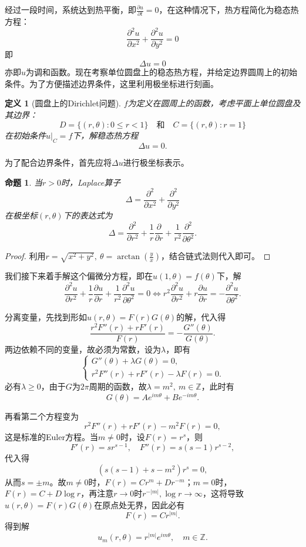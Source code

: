 \documentclass[UTF8,zihao=5,linespread=1.34]{ctexart}
\theoremstyle{cnplain}
\newtheorem{proposition}[theorem]{命题}
\newtheorem{definition}[theorem]{定义}
\theoremstyle{cnremark}
\begin{document}
经过一段时间，系统达到热平衡，即$\frac{\partial u}{\partial t} = 0$，在这种情况下，热方程简化为稳态热方程：
\[
\frac{\partial^{2}u}{\partial x^{2}} + \frac{\partial^{2}u}{\partial y^{2}} = 0
\]
即
\[
\Delta u = 0
\]
亦即$u$为调和函数。现在考察单位圆盘上的稳态热方程，并给定边界圆周上的初始条件。为了方便描述边界条件，这里利用极坐标进行刻画。

\begin{definition}[圆盘上的Dirichlet问题]
$f$为定义在圆周上的函数，考虑平面上单位圆盘及其边界：
\[
D = \{(r,\theta): 0 \leq r < 1\}\quad\text{和}\quad C = \{(r,\theta): r = 1\}
\]
在初始条件$u|_{C} = f$下，解稳态热方程
\[
\Delta u = 0.
\]
\end{definition}

为了配合边界条件，首先应将$\Delta u$进行极坐标表示。

\begin{proposition}\label{prop:polar-laplacian}
当$r>0$时，Laplace算子
\[
\Delta = \frac{\partial^{2}}{\partial x^{2}} + \frac{\partial^{2}}{\partial y^{2}}
\]
在极坐标$(r,\theta)$下的表达式为
\[
\Delta = \frac{\partial^{2}}{\partial r^{2}} + \frac{1}{r}\frac{\partial}{\partial r} + \frac{1}{r^{2}}\frac{\partial^{2}}{\partial\theta^{2}}.
\]
\end{proposition}

\begin{proof}
利用$r = \sqrt{x^{2} + y^{2}},\ \theta = \arctan(\frac{y}{x})$，结合链式法则代入即可。
\end{proof}

我们接下来着手解这个偏微分方程，即在$u(1,\theta) = f(\theta)$下，解
\[
\frac{\partial^{2}u}{\partial r^{2}} + \frac{1}{r}\frac{\partial u}{\partial r} + \frac{1}{r^{2}}\frac{\partial^{2}u}{\partial\theta^{2}} = 0
\Longleftrightarrow r^{2}\frac{\partial^{2}u}{\partial r^{2}} + r\frac{\partial u}{\partial r} = -\frac{\partial^{2}u}{\partial\theta^{2}}.
\]

分离变量，先找到形如$u(r,\theta) = F(r)G(\theta)$的解，代入得
\[
\frac{r^{2}F''(r) + rF'(r)}{F(r)} = -\frac{G''(\theta)}{G(\theta)}.
\]
两边依赖不同的变量，故必须为常数，设为$\lambda$，即有
\[
\begin{cases}
G''(\theta) + \lambda G(\theta) = 0, \\
r^{2}F''(r) + rF'(r) - \lambda F(r) = 0.
\end{cases}
\]
必有$\lambda \geq 0$，由于$G$为$2\pi$周期的函数，故$\lambda = m^{2},\ m \in \mathbb{Z}$，此时有
\[
G(\theta) = Ae^{im\theta} + Be^{-im\theta}.
\]

再看第二个方程变为
\[
r^{2}F''(r) + rF'(r) - m^{2}F(r) = 0,
\]
这是标准的Euler方程。当$m \neq 0$时，设$F(r) = r^{s}$，则
\[
F'(r) = sr^{s-1},\quad F''(r) = s(s-1)r^{s-2},
\]
代入得
\[
(s(s-1) + s - m^{2})r^{s} = 0,
\]
从而$s = \pm m$。故$m \neq 0$时，$F(r) = Cr^{m} + Dr^{-m}$；$m = 0$时，$F(r) = C + D\log r$，再注意$r \rightarrow 0$时$r^{-|m|},\log r \rightarrow \infty$，这将导致$u(r,\theta) = F(r)G(\theta)$在原点处无界，因此必有
\[
F(r) = Cr^{|m|}.
\]
得到解
\[
u_{m}(r,\theta) = r^{|m|}e^{im\theta},\quad m \in \mathbb{Z}.
\]
\end{document}
